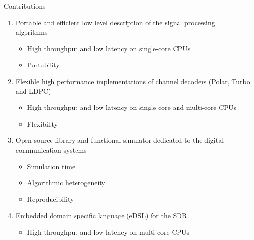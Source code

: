 \begin{frame}{Contributions}
  \begin{enumerate}
    \item<1-> Portable and efficient low level description of the signal processing algorithms~\cite{Cassagne2018}
    \begin{itemize}
      \item High throughput and low latency on single-core CPUs
      \item Portability
    \end{itemize}
    \vspace{.3em}
    \item<2-> Flexible high performance implementations of channel decoders (Polar, Turbo and LDPC)~\cite{Cassagne2015c,Cassagne2016a,Cassagne2016b,Leonardon2019,Ghaffari2019}
    \begin{itemize}
      \item High throughput and low latency on single core and multi-core CPUs
      \item Flexibility
    \end{itemize}
    \vspace{.3em}
    \item<3-> Open-source library and functional simulator dedicated to the digital communication systems~\cite{Cassagne2017,Cassagne2017a,Cassagne2019a}
    \begin{itemize}
      \item Simulation time
      \item Algorithmic heterogeneity
      \item Reproducibility
    \end{itemize}
    \vspace{.3em}
    \item<4-> Embedded domain specific language (eDSL) for the SDR
    \begin{itemize}
      \item High throughput and low latency on multi-core CPUs
    \end{itemize}
  \end{enumerate}
\end{frame}
